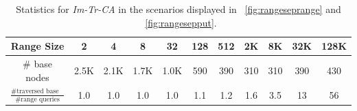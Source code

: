 \documentclass[a4paper,UKenglish]{oasics-v2016}
\begin{document}

 \begin{table}[h]%
  \caption{Statistics for \emph{Im-Tr-CA} in the scenarios displayed in \figurename~\ref{fig:rangeseprange} and \figurename~\ref{fig:rangesepput}.}
  \label{tab:nodestats}
  \begin{adjustbox}{max width=\textwidth}
      \begin{tabular}{c|cccccccccc} %
      Range Size  & 2 & 4 & 8 & 32 & 128 & 512 & 2K & 8K & 32K & 128K \\\hline
      \# base nodes & 2.5K & 2.1K & 1.7K & 1.0K & 590 & 390 & 310 & 310 & 390 & 430 \\ 
      $\frac{\text{\# traversed base nodes}}{\text{\# range queries}}$ & 1.0 & 1.0 & 1.0 & 1.0 & 1.1 & 1.2 & 1.6 & 3.5 & 13 & 56 \\ %
    \end{tabular}
    \end{adjustbox}
\end{table} 
\end{document}
